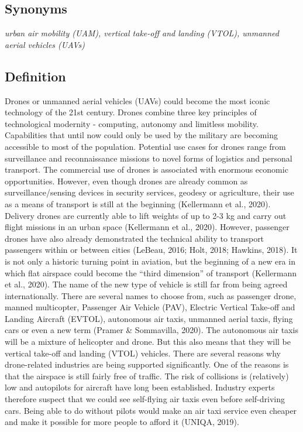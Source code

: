 \documentclass[
]{book}
\begin{document}
\hypertarget{synonyms-8}{%
\subsection*{Synonyms}\label{synonyms-8}}

\emph{urban air mobility (UAM), vertical take-off and landing (VTOL), unmanned aerial vehicles (UAVs)}

\hypertarget{definition-9}{%
\subsection*{Definition}\label{definition-9}}

Drones or unmanned aerial vehicles (UAVs) could become the most iconic technology of the 21st century. Drones combine three key principles of technological modernity - computing, autonomy and limitless mobility. Capabilities that until now could only be used by the military are becoming accessible to most of the population. Potential use cases for drones range from surveillance and reconnaissance missions to novel forms of logistics and personal transport. The commercial use of drones is associated with enormous economic opportunities. However, even though drones are already common as surveillance/sensing devices in security services, geodesy or agriculture, their use as a means of transport is still at the beginning (Kellermann et al., 2020).
Delivery drones are currently able to lift weights of up to 2-3 kg and carry out flight missions in an urban space (Kellermann et al., 2020). However, passenger drones have also already demonstrated the technical ability to transport passengers within or between cities (LeBeau, 2016; Holt, 2018; Hawkins, 2018). It is not only a historic turning point in aviation, but the beginning of a new era in which flat airspace could become the ``third dimension'' of transport (Kellermann et al., 2020).
The name of the new type of vehicle is still far from being agreed internationally. There are several names to choose from, such as passenger drone, manned multicopter, Passenger Air Vehicle (PAV), Electric Vertical Take-off and Landing Aircraft (EVTOL), autonomous air taxis, unmanned aerial taxis, flying cars or even a new term (Pramer \& Sommavilla, 2020).
The autonomous air taxis will be a mixture of helicopter and drone. But this also means that they will be vertical take-off and landing (VTOL) vehicles.
There are several reasons why drone-related industries are being supported significantly. One of the reasons is that the airspace is still fairly free of traffic. The risk of collisions is (relatively) low and autopilots for aircraft have long been established. Industry experts therefore suspect that we could see self-flying air taxis even before self-driving cars. Being able to do without pilots would make an air taxi service even cheaper and make it possible for more people to afford it (UNIQA, 2019).
\end{document}
